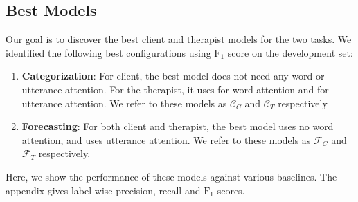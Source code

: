 \subsection{Best Models}
\label{ssec:models}
Our goal is to discover the best client and therapist models for the
two tasks.  We identified the following best configurations using $\text{F}_{1}$
score on the development set:
\begin{enumerate}[nosep]
\item {\bf Categorization}: For client, the best model does not need any
  word or utterance attention. For the therapist, it uses \GMGRUH
  for word attention and \anchor for utterance attention. We refer
  to these models as $\mathcal{C}_C$ and $\mathcal{C}_T$ respectively
\item {\bf Forecasting}: For both client and  therapist, the best
  model uses no word attention, and uses \self utterance
  attention. We refer to these models as $\mathcal{F}_C$ and
  $\mathcal{F}_T$ respectively.
\end{enumerate}
Here, we show the performance of these models against various
baselines. The appendix gives label-wise precision, recall and $\text{F}_{1}$
scores.



